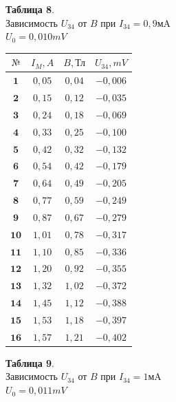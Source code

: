 \documentclass[11pt,a4paper]{article}
\begin{document}
\begin{paracol}{2}
\begin{table}[h!] 
	\begin{center} 
		\textbf{Таблица 8}. \\ Зависимость $U_{34}$ от $B$ при $I_{34} = 0,9 \text{мA}$\\ 
		$U_0 = 0,010 mV$
		\\
		\begin{tabular}{|c|c|c|c|} 
			\hline 
			$\text{№}$ & $I_M,A$ & $B,\text{Тл}$ & $U_{34},mV$ \\ \hline 
			$\textbf{1}$ & $0,05$ & $0,04$ & $-0,006$ \\ \hline 
			$\textbf{2}$ & $0,15$ & $0,12$ & $-0,035$ \\ \hline 
			$\textbf{3}$ & $0,24$ & $0,18$ & $-0,069$ \\ \hline 
			$\textbf{4}$ & $0,33$ & $0,25$ & $-0,100$ \\ \hline 
			$\textbf{5}$ & $0,42$ & $0,32$ & $-0,132$ \\ \hline 
			$\textbf{6}$ & $0,54$ & $0,42$ & $-0,179$ \\ \hline 
			$\textbf{7}$ & $0,64$ & $0,49$ & $-0,205$ \\ \hline 
			$\textbf{8}$ & $0,77$ & $0,59$ & $-0,249$ \\ \hline 
			$\textbf{9}$ & $0,87$ & $0,67$ & $-0,279$ \\ \hline 
			$\textbf{10}$ & $1,01$ & $0,78$ & $-0,317$ \\ \hline 
			$\textbf{11}$ & $1,10$ & $0,85$ & $-0,336$ \\ \hline 
			$\textbf{12}$ & $1,20$ & $0,92$ & $-0,355$ \\ \hline 
			$\textbf{13}$ & $1,32$ & $1,02$ & $-0,372$ \\ \hline 
			$\textbf{14}$ & $1,45$ & $1,12$ & $-0,388$ \\ \hline 
			$\textbf{15}$ & $1,53$ & $1,18$ & $-0,397$ \\ \hline 
			$\textbf{16}$ & $1,57$ & $1,21$ & $-0,402$ \\ \hline 
		\end{tabular} 
	\end{center} 
\end{table}
\switchcolumn
\begin{table}[h!] 
	\begin{center} 
		\textbf{Таблица 9}. \\ Зависимость $U_{34}$ от $B$ при $I_{34} = 1 \text{мA}$\\ 
		$U_0 = 0,011 mV$

\end{center}
\end{table}
\end{paracol}
\end{document}
